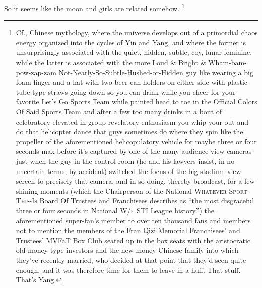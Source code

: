 {{		So it seems like the moon and girls are related somehow.%
		\footnote{
		Cf., Chinese mythology,
		where the universe develops out of a primordial chaos energy organized
		into the cycles of Yin and Yang, and where the former is unsurprisingly
		associated with the quiet, hidden, subtle, coy, lunar feminine,
		while the latter is associated with the more Loud \& Bright \&
		Wham-bam-pow-zap-zam Not-Nearly-So-Subtle-Hushed-or-Hidden guy 
		like wearing a big foam finger and a hat with two beer can holders
		on either side with plastic tube type straws going down so you can 
		drink while you cheer for your favorite Let's Go Sports Team while
		painted head to toe in the Official Colors Of Said Sports Team
		and after a few too many drinks in a bout of celebratory elevated in-group
		revelatory enthusiasm you whip your  out and do that helicopter dance
		that guys sometimes do where they spin 
		like the propeller of the aforementioned helicopulatory vehicle
		for maybe three or four seconds max before it's captured by one
		of the many audience-view-cameras just when the guy in the control room
		(he and his lawyers insist, in no uncertain terms, by accident)
		switched the focus of the big stadium view screen to precisely that camera,
		and in so doing, thereby broadcast, for a few shining moments (which
		the Chairperson of the National \textsc{Whatever-Sport-This-Is} Board Of
		Trustees and Franchisees describes as ``the most disgraceful three or
		four seconds in National \textsc{W/e} STI League history'') the aforementioned
		super-fan's member to over ten thousand fans and members not to mention the
		members of the Fran Qizi Memorial Franchisees' and Trustees' MVFaT Box Club seated up in the box
		seats with the aristocratic old-money-type investors and the new-money Chinese
		family into which they've recently married, who decided at that point that
		they'd seen quite enough, and it was therefore time for them to leave in a huff.
		That stuff.
		That's Yang.
}}}
